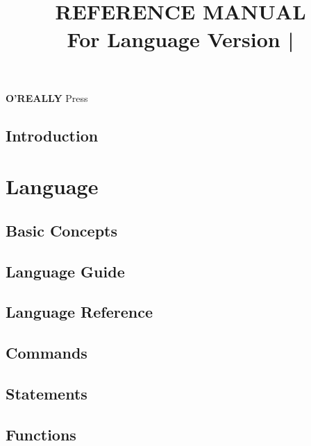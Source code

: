 \documentclass[10pt, stock, openany, chapter]{memoir}
\title{\HUGE\textbf{\MakeUppercase{\tbas} \\ REFERENCE MANUAL} \\ \Large \vspace{1em} For Language Version \tbasver\hspace{0.75em}|\hspace{0.75em}\theedition}
\date{}
\author{}
\newcommand{\oreallypress}{\begingroup\hspace{0.083em}\large\textbf{O'REALLY\raisebox{1ex}{\scriptsize ?}} \large Press\endgroup}
\begin{document}
\maketitle{}
\thispagestyle{empty}
\vfill
\oreallypress

\newpage


\thispagestyle{empty}

\newpage

\setcounter{page}{3}
\tableofcontents*



\openright
\chapter{Introduction}

\openany



\part{Language}

\chapter{Basic Concepts}


\chapter{Language Guide}

%
%

\chapter{Language Reference}


\chapter{Commands}


\chapter{Statements}


\chapter{Functions}

\end{document}
